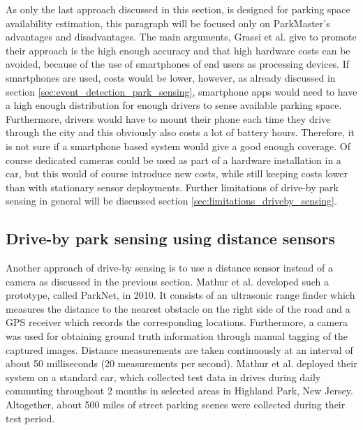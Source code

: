 As only the last approach discussed in this section, is designed for parking space availability estimation, this paragraph will be focused only on ParkMaster's advantages and disadvantages. The main arguments, Grassi et al. give to promote their approach is the high enough accuracy and that high hardware costs can be avoided, because of the use of smartphones of end users as processing devices. If smartphones are used, costs would be lower, however, as already discussed in section \ref{sec:event_detection_park_sensing}, smartphone apps would need to have a high enough distribution for enough drivers to sense available parking space. Furthermore, drivers would have to mount their phone each time they drive through the city and this obviously also costs a lot of battery hours. Therefore, it is not sure if a smartphone based system would give a good enough coverage. Of course dedicated cameras could be used as part of a hardware installation in a car, but this would of course introduce new costs, while still keeping costs lower than with stationary sensor deployments. Further limitations of drive-by park sensing in general will be discussed section \ref{sec:limitations_driveby_sensing}.





\subsection{Drive-by park sensing using distance sensors}
\label{sec:related_driveby_park_sensing_distance}

Another approach of drive-by sensing is to use a distance sensor instead of a camera as discussed in the previous section. Mathur et al. \cite{Mathur:2010:PDS:1814433.1814448} developed such a prototype, called ParkNet, in 2010. It consists of an ultrasonic range finder which measures the distance to the nearest obstacle on the right side of the road and a GPS receiver which records the corresponding locations. Furthermore, a camera was used for obtaining ground truth information through manual tagging of the captured images. Distance measurements are taken continuously at an interval of about 50 milliseconds (20 measurements per second). Mathur et al. deployed their system on a standard car, which collected test data in drives during daily commuting throughout 2 months in selected areas in Highland Park, New Jersey. Altogether, about 500 miles of street parking scenes were collected during their test period. 

